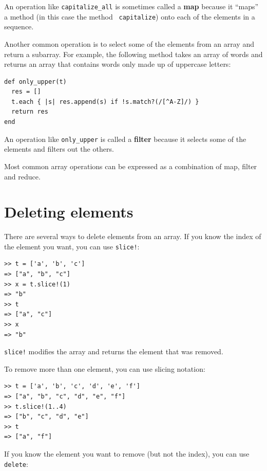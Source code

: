 \documentclass[10pt]{book}
\begin{document}
An operation like \verb"capitalize_all" is sometimes called a {\bf
map} because it ``maps'' a method (in this case the method {\tt
capitalize}) onto each of the elements in a sequence.

Another common operation is to select some of the elements from
an array and return a subarray.  For example, the following
method takes an array of words and returns an array that contains
words only made up of uppercase letters:

\begin{verbatim}
def only_upper(t)
  res = []
  t.each { |s| res.append(s) if !s.match?(/[^A-Z]/) }
  return res
end
\end{verbatim}
%

An operation like \verb"only_upper" is called a {\bf filter} because
it selects some of the elements and filters out the others.

Most common array operations can be expressed as a combination
of map, filter and reduce.


\section{Deleting elements}

There are several ways to delete elements from an array.  If you
know the index of the element you want, you can use
{\tt slice!}:

\begin{verbatim}
>> t = ['a', 'b', 'c']
=> ["a", "b", "c"]
>> x = t.slice!(1)
=> "b"
>> t
=> ["a", "c"]
>> x
=> "b"
\end{verbatim}
%
{\tt slice!} modifies the array and returns the element that was removed.

To remove more than one element, you can use slicing notation:

\begin{verbatim}
>> t = ['a', 'b', 'c', 'd', 'e', 'f']
=> ["a", "b", "c", "d", "e", "f"]
>> t.slice!(1..4)
=> ["b", "c", "d", "e"]
>> t
=> ["a", "f"]
\end{verbatim}
%

%
If you know the element you want to remove (but not the index), you
can use {\tt delete}:
\end{document}
